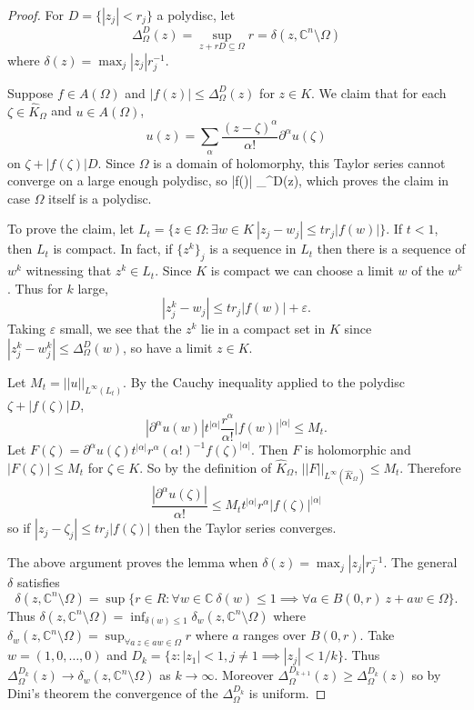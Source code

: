 \documentclass[12pt]{report}
\newcommand{\CC}{\mathbb{C}}
\theoremstyle{definition}
\begin{document}
\begin{proof}
    For $D = \{|z_j| < r_j\}$ a polydisc, let
    $$\Delta_\Omega^D(z) = \sup_{z + rD \subseteq \Omega} r = \delta(z, \CC^n \setminus \Omega)$$
    where $\delta(z) = \max_j |z_j|r_j^{-1}$.

    Suppose $f \in A(\Omega)$ and $|f(z)| \leq \Delta_\Omega^D(z)$ for $z \in K$. We claim that for each $\zeta \in \hat K_\Omega$ and $u \in A(\Omega)$,
    $$u(z) = \sum_\alpha \frac{(z - \zeta)^\alpha}{\alpha!} \partial^\alpha u(\zeta)$$
    on $\zeta + |f(\zeta)|D$. Since $\Omega$ is a domain of holomorphy, this Taylor series cannot converge on a large enough polydisc, so |f(\zeta)| \leq \Delta_\Omega^D(z), which proves the claim in case $\Omega$ itself is a polydisc.

    To prove the claim, let $L_t = \{z \in \Omega: \exists w \in K~|z_j - w_j| \leq tr_j|f(w)|\}$. If $t < 1$, then $L_t$ is compact. In fact, if $\{z^k\}_j$ is a sequence in $L_t$ then there is a sequence of $w^k$ witnessing that $z^k \in L_t$. Since $K$ is compact we can choose a limit $w$ of the $w^k$. Thus for $k$ large,
    $$|z^k_j - w_j| \leq tr_j |f(w)| + \varepsilon.$$
    Taking $\varepsilon$ small, we see that the $z^k$ lie in a compact set in $K$ since $|z_j^k - w_j^k| \leq \Delta_\Omega^D(w)$, so have a limit $z \in K$.

    Let $M_t = ||u||_{L^\infty(L_t)}$. By the Cauchy inequality applied to the polydisc $\zeta + |f(\zeta)|D$,
    $$|\partial^\alpha u(w)| t^{|\alpha|} \frac{r^\alpha}{\alpha!} |f(w)|^{|\alpha|} \leq M_t.$$
    Let $F(\zeta) = \partial^\alpha u(\zeta) t^{|\alpha|} r^\alpha (\alpha!)^{-1} f(\zeta)^{|\alpha|}$. Then $F$ is holomorphic and $|F(\zeta)| \leq M_t$ for $\zeta \in K$. So by the definition of $\hat K_\Omega$, $||F||_{L^\infty(\hat K_\Omega)} \leq M_t$. Therefore
    $$\frac{|\partial^\alpha u(\zeta)|}{\alpha!} \leq M_t t^{|\alpha|} r^\alpha |f(\zeta)|^{|\alpha|}$$
    so if $|z_j - \zeta_j| \leq tr_j |f(\zeta)|$ then the Taylor series converges.

    The above argument proves the lemma when $\delta(z) = \max_j |z_j|r_j^{-1}$. The general $\delta$ satisfies
    $$\delta(z, \CC^n \setminus \Omega) = \sup \{r \in R: \forall w \in \CC ~\delta(w) \leq 1 \implies \forall a \in B(0, r) ~z + aw \in \Omega\}.$$
    Thus $\delta(z, \CC^n \setminus \Omega) = \inf_{\delta(w) \leq 1} \delta_w(z, \CC^n \setminus \Omega)$ where $\delta_w(z, \CC^n \setminus \Omega) = \sup_{\forall a ~z \in aw \in \Omega} r$ where $a$ ranges over $B(0, r)$. Take $w = (1, 0, \dots, 0)$ and $D_k = \{z: |z_1| < 1, j \neq 1 \implies |z_j| < 1/k\}$. Thus $\Delta^{D_k}_\Omega(z) \to \delta_w(z, \CC^n \setminus \Omega)$ as $k \to \infty$. Moreover $\Delta^{D_{k+1}}_\Omega(z) \geq \Delta^{D_k}_\Omega(z)$ so by Dini's theorem the convergence of the $\Delta^{D_k}_\Omega$ is uniform. 


\end{proof}
\end{document}

